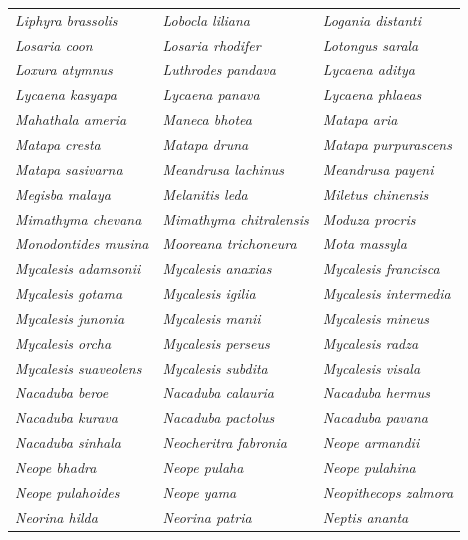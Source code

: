 \documentclass[runningheads]{llncs}
\begin{document}
\begin{longtable}{lll}
\textit{Liphyra brassolis} & \textit{Lobocla liliana} & \textit{Logania distanti} \\
\textit{Losaria coon} & \textit{Losaria rhodifer} & \textit{Lotongus sarala} \\
\textit{Loxura atymnus} & \textit{Luthrodes pandava} & \textit{Lycaena aditya} \\
\textit{Lycaena kasyapa} & \textit{Lycaena panava} & \textit{Lycaena phlaeas} \\
\textit{Mahathala ameria} & \textit{Maneca bhotea} & \textit{Matapa aria} \\
\textit{Matapa cresta} & \textit{Matapa druna} & \textit{Matapa purpurascens} \\
\textit{Matapa sasivarna} & \textit{Meandrusa lachinus} & \textit{Meandrusa payeni} \\
\textit{Megisba malaya} & \textit{Melanitis leda} & \textit{Miletus chinensis} \\
\textit{Mimathyma chevana} & \textit{Mimathyma chitralensis} & \textit{Moduza procris} \\
\textit{Monodontides musina} & \textit{Mooreana trichoneura} & \textit{Mota massyla} \\
\textit{Mycalesis adamsonii} & \textit{Mycalesis anaxias} & \textit{Mycalesis francisca} \\
\textit{Mycalesis gotama} & \textit{Mycalesis igilia} & \textit{Mycalesis intermedia} \\
\textit{Mycalesis junonia} & \textit{Mycalesis manii} & \textit{Mycalesis mineus} \\
\textit{Mycalesis orcha} & \textit{Mycalesis perseus} & \textit{Mycalesis radza} \\
\textit{Mycalesis suaveolens} & \textit{Mycalesis subdita} & \textit{Mycalesis visala} \\
\textit{Nacaduba beroe} & \textit{Nacaduba calauria} & \textit{Nacaduba hermus} \\
\textit{Nacaduba kurava} & \textit{Nacaduba pactolus} & \textit{Nacaduba pavana} \\
\textit{Nacaduba sinhala} & \textit{Neocheritra fabronia} & \textit{Neope armandii} \\
\textit{Neope bhadra} & \textit{Neope pulaha} & \textit{Neope pulahina} \\
\textit{Neope pulahoides} & \textit{Neope yama} & \textit{Neopithecops zalmora} \\
\textit{Neorina hilda} & \textit{Neorina patria} & \textit{Neptis ananta} \\

\end{longtable}
\end{document}
